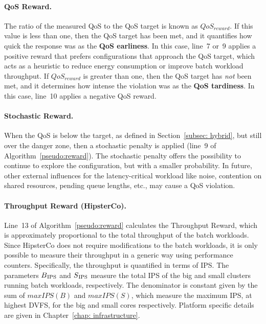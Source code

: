 \paragraph*{QoS Reward.} The ratio of the measured QoS to the QoS target is known as
$QoS_\mathit{reward}$.  If this value is less than one, then the QoS target has been met,
and it quantifies how quick the response was as the \textbf{QoS earliness}. In this case,
line~7 or~9 applies a positive reward that prefers configurations that approach the QoS
target, which acts as a heuristic to reduce energy consumption or improve batch workload
throughput.  If $QoS_\mathit{reward}$ is greater than one, then the QoS target has
\emph{not} been met, and it determines how intense the violation was as the \textbf{QoS
tardiness}. In this case, line~10 applies a negative QoS reward. 



\paragraph*{Stochastic Reward.} When the QoS is below the target, as defined in
Section~\ref{subsec: hybrid}, but still over the danger zone, then a stochastic penalty is
applied (line~9 of Algorithm~\ref{pseudo:reward}). The stochastic penalty offers the
possibility to continue to explore the configuration, but with a smaller probability. In
future, other external influences for the latency-critical workload like noise, contention
on shared resources, pending queue lengths, etc., may cause a QoS violation.





  \paragraph*{Throughput Reward (HipsterCo).} Line~13 of
Algorithm~\ref{pseudo:reward} calculates the Throughput Reward, which is approximately
proportional to the total throughput of the batch workloads. Since HipsterCo does not
require modifications to the batch workloads, it is only possible to measure their
throughput in a generic way using performance counters. Specifically, the throughput is
quantified in terms of IPS. The parameters $B\textsubscript{IPS}$ and
$S\textsubscript{IPS}$ measure the total IPS of the big and small clusters running batch
workloads, respectively. The denominator is constant given by the sum of $maxIPS(B)$ and
$maxIPS(S)$, which measure the maximum IPS, at highest DVFS, for the big and small cores
respectively. Platform specific details are given in Chapter~\ref{chap:
infrastructure}.%

